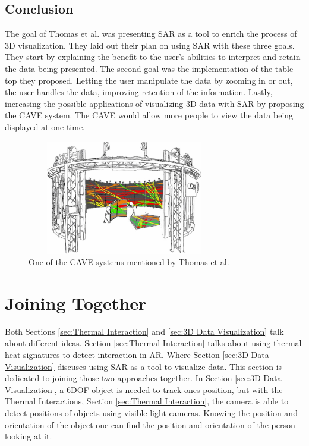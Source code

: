 \documentclass{sig-alternate}
\begin{document}
\subsection{Conclusion}
\label{sec:Conclusion}
The goal of Thomas et al. \cite{3D} was presenting SAR as a tool to enrich the process of 3D visualization. They laid out their plan on using SAR with these three goals. They start by explaining the benefit to the user's abilities to interpret and retain the data being presented. The second goal was the implementation of the table-top they proposed. Letting the user manipulate the data by zooming in or out, the user handles the data, improving retention of the information. Lastly, increasing the possible applications of visualizing 3D data with SAR by proposing the CAVE system. The CAVE would allow more people to view the data being displayed at one time.

\begin{figure}
	\includegraphics[width=8.5cm, height=5cm]{Cave}
	\caption{One of the CAVE systems mentioned by Thomas et al. \cite{3D}}
	\label{fig:Cave}
\end{figure}  

\section{Joining Together}
\label{sec:Joining Together}
Both Sections \ref{sec:Thermal Interaction} and \ref{sec:3D Data Visualization} talk about different ideas. Section \ref{sec:Thermal Interaction} talks about using thermal heat signatures to detect interaction in AR. Where Section \ref{sec:3D Data Visualization} discuses using SAR as a tool to visualize data. This section is dedicated to joining those two approaches together. In Section \ref{sec:3D Data Visualization}, a 6DOF object is needed to track ones position, but with the Thermal Interactions, Section \ref{sec:Thermal Interaction}, the camera is able to detect positions of objects using visible light cameras. Knowing the position and orientation of the object one can find the position and orientation of the person looking at it.  
\end{document}
